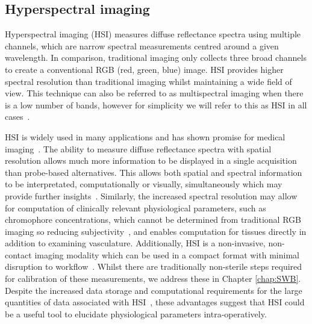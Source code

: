 \subsection{Hyperspectral imaging}\label{sec:introHSI}
Hyperspectral imaging (HSI) measures diffuse reflectance spectra using multiple channels, which are narrow spectral measurements centred around a given wavelength. In comparison, traditional imaging only collects three broad channels to create a conventional RGB (red, green, blue) image. HSI provides higher spectral resolution than traditional imaging whilst maintaining a wide field of view. This technique can also be referred to as multispectral imaging when there is a low number of bands, however for simplicity we will refer to this as HSI in all cases~\cite{Clancy2020}. 

HSI is widely used in many applications and has shown promise for medical imaging~\cite{Lu2014,Giannoni2018,Calin2014,Shapey2019}. The ability to measure diffuse reflectance spectra with spatial resolution allows much more information to be displayed in a single acquisition than probe-based alternatives. This allows both spatial and spectral information to be interpretated, computationally or visually, simultaneously which may provide further insights~\cite{Seidlitz2022}. Similarly, the increased spectral resolution may allow for computation of clinically relevant physiological parameters, such as chromophore concentrations, which cannot be determined from traditional RGB imaging so reducing subjectivity~\cite{Seidlitz2022}, and enables computation for tissues directly in addition to examining vasculature. Additionally, HSI is a non-invasive, non-contact imaging modality which can be used in a compact format with minimal disruption to workflow~\cite{Thoenissen2023, Ebner2021, MacCormac2023}. Whilst there are traditionally non-sterile steps required for calibration of these measurements, we address these in Chapter \ref{chap:SWB}. Despite the increased data storage and computational requirements for the large quantities of data associated with HSI~\cite{Altamimi2022}, these advantages suggest that HSI could be a useful tool to elucidate physiological parameters intra-operatively. 

